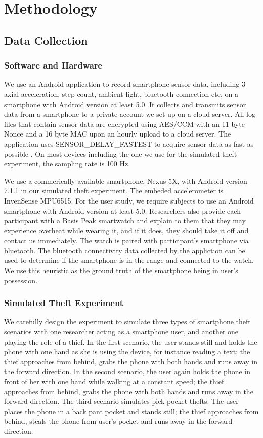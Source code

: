 \documentclass{soups}
\begin{document}
\section{Methodology}

\subsection{Data Collection}

\subsubsection{Software and Hardware}
We use an Android application to record smartphone sensor data, including 3 axial acceleration, step count, ambient light, bluetooth connection etc, on a smartphone with Android version at least 5.0. 
It collects and transmits sensor data from a smartphone to a private account we set up on a cloud server. 
All log files that contain sensor data are encrypted using AES/CCM with an 11 byte Nonce and a 16 byte MAC upon an hourly upload to a cloud server. 
The application uses SENSOR\_DELAY\_FASTEST to acquire sensor data as fast as possible \cite{android:doc}. 
On most devices including the one we use for the simulated theft experiment, the sampling rate is 100 Hz. 

We use a commerically available smartphone, Nexus 5X, with Android version 7.1.1 in our simulated theft experiment. 
The embeded accelerometer is InvenSense MPU6515. 
For the user study, we require subjects to use an Android smartphone with Android version at least 5.0. 
Researchers also provide each participant with a Basis Peak smartwatch and explain to them that they may experience overheat while wearing it, and if it does, they should take it off and contact us immediately. 
The watch is paired with participant's smartphone via bluetooth. 
The bluetooth connectivity data collected by the appliction can be used to determine if the smartphone is in the range and connected to the watch. We use this heuristic as the ground truth of the smartphone being in user's possession.

\subsubsection{Simulated Theft Experiment}
We carefully design the experiment to simulate three types of smartphone theft scenarios with one researcher acting as a smartphone user, and another one playing the role of a thief. 
In the first scenario, the user stands still and holds the phone with one hand as she is using the device, for instance reading a text; the thief approaches from behind, grabs the phone with both hands and runs away in the forward direction. 
In the second scenario, the user again holds the phone in front of her with one hand while walking at a constant speed; the thief approaches from behind, grabs the phone with both hands and runs away in the forward direction. 
The third scenario simulates pick-pocket thefts. The user places the phone in a back pant pocket and stands still; the thief approaches from behind, steals the phone from user's pocket and runs away in the forward direction.
\end{document}
